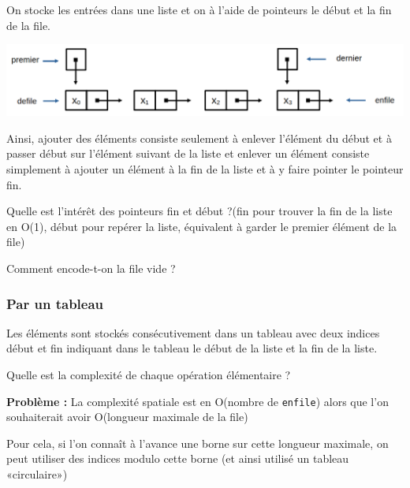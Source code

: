 \begin{idee}
	On stocke les entrées dans une liste et on à l'aide de pointeurs le début et la fin de la file.
\end{idee}

\begin{center}
	\includegraphics[width=0.8\linewidth ]{lecon/05-piles_files/liste_chainee.png}
\end{center}

\begin{impl}
	Ainsi, ajouter des éléments consiste seulement à enlever l'élément du début et à passer début sur l'élément suivant de la liste et enlever un élément consiste simplement à ajouter un élément à la fin de la liste et à y faire pointer le pointeur fin.
\end{impl}

\begin{exercise}
	Quelle est l'intérêt des pointeurs fin et début ?(fin pour trouver la fin de la liste en O(1), début pour repérer la liste, équivalent à garder le premier élément de la file)
\end{exercise}

\begin{exercise}
	Comment encode-t-on la file vide ?
\end{exercise}


\subsubsection{Par un tableau}

\begin{idee}
	Les éléments sont stockés consécutivement dans un tableau avec deux indices début et fin indiquant dans le tableau le début de la liste et la fin de la liste.
\end{idee}

\begin{exercise}
	Quelle est la complexité de chaque opération élémentaire ?
\end{exercise}

\textbf{Problème :} La complexité spatiale est en O(nombre de \texttt{enfile}) alors que l'on souhaiterait avoir O(longueur maximale de la file)

\begin{idee}
	Pour cela, si l'on connaît à l'avance une borne sur cette longueur maximale, on peut utiliser des indices modulo cette borne (et ainsi utilisé un tableau «circulaire»)
\end{idee}

